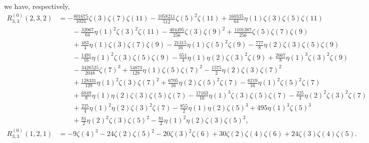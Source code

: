 \documentclass[12pt]{amsart}%
\theoremstyle{definition}
\begin{document}
we have, respectively,
\begin{align*}
R^{(0)}_{3,3}(2,3,2)
&= -\frac{801675}{1024} \zeta(3) \zeta(7) \zeta(11)
 -\frac{1058211}{512} \zeta(5)^2 \zeta(11)
 +\frac{160335}{64} \eta(1) \zeta(3) \zeta(5) \zeta(11)\\
&\qquad -\frac{32067}{64} \eta(1)^2 \zeta(3)^2 \zeta(11)
 -\frac{404495}{256}  \zeta(3) \zeta(9)^2
 +\frac{1101387}{256}  \zeta(5) \zeta(7) \zeta(9)\\
&\qquad +\frac{483}{4} \eta(1)  \zeta(3) \zeta(7) \zeta(9)
-\frac{21315}{16} \eta(1)  \zeta(5)^2 \zeta(9)
 -\frac{777}{8} \eta(2)  \zeta(3) \zeta(5) \zeta(9)\\
&\qquad -\frac{1491}{16} \eta(1)^2  \zeta(3) \zeta(5) \zeta(9)
 -\frac{651}{4} \eta(1) \eta(2)  \zeta(3)^2 \zeta(9)
 +\frac{2667}{8} \eta(1)^3 \zeta(3)^2 \zeta(9)\\
&\qquad -\frac{3426525}{2048}  \zeta(7)^3
 +\frac{54873}{128} \eta(1)  \zeta(5) \zeta(7)^2
 -\frac{1575}{2} \eta(2)  \zeta(3) \zeta(7)^2\\
&\qquad +\frac{128331}{128} \eta(1)^2 \zeta(3) \zeta(7)^2
 +\frac{6705}{16} \eta(2)  \zeta(5)^2 \zeta(7)
 -\frac{6219}{16} \eta(1)^2  \zeta(5)^2 \zeta(7)\\
&\qquad +\frac{6849}{8} \eta(1) \eta(2)  \zeta(3) \zeta(5) \zeta(7)
 -\frac{17163}{16} \eta(1)^3 \zeta(3) \zeta(5) \zeta(7)
 -\frac{225}{4} \eta(2)^2  \zeta(3)^2 \zeta(7)\\
&\qquad +\frac{225}{4} \eta(1)^2 \eta(2) \zeta(3)^2 \zeta(7)
-\frac{855}{2} \eta(1) \eta(2)  \zeta(5)^3
 +495 \eta(1)^3 \zeta(5)^3\\
&\qquad +\frac{81}{2} \eta(2)^2 \zeta(3) \zeta(5)^2
-\frac{81}{2} \eta(1)^2 \eta(2) \zeta(3) \zeta(5)^2,\\
R^{(0)}_{3,3}(1,2,1)
&= -9\zeta(4)^3 -24\zeta(2)\zeta(5)^2 -20\zeta(3)^2\zeta(6)  +30\zeta(2)\zeta(4)\zeta(6)
+24\zeta(3)\zeta(4)\zeta(5). 
\end{align*}
\end{document}
